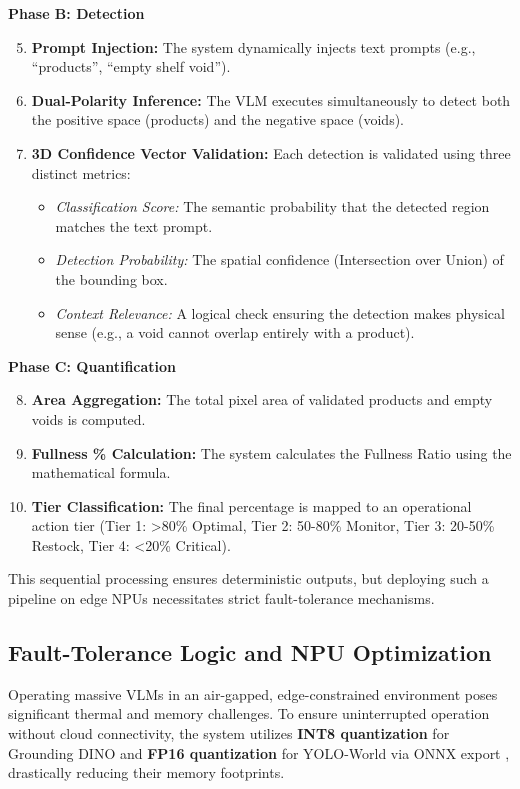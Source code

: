 \textbf{Phase B: Detection}
\begin{enumerate}
    \setcounter{enumi}{4}
    \item \textbf{Prompt Injection:} The system dynamically injects text prompts (e.g., ``products'', ``empty shelf void'').
    \item \textbf{Dual-Polarity Inference:} The VLM executes simultaneously to detect both the positive space (products) and the negative space (voids).
    \item \textbf{3D Confidence Vector Validation:} Each detection is validated using three distinct metrics:
    \begin{itemize}
        \item \textit{Classification Score:} The semantic probability that the detected region matches the text prompt.
        \item \textit{Detection Probability:} The spatial confidence (Intersection over Union) of the bounding box.
        \item \textit{Context Relevance:} A logical check ensuring the detection makes physical sense (e.g., a void cannot overlap entirely with a product).
    \end{itemize}
\end{enumerate}

\textbf{Phase C: Quantification}
\begin{enumerate}
    \setcounter{enumi}{7}
    \item \textbf{Area Aggregation:} The total pixel area of validated products and empty voids is computed.
    \item \textbf{Fullness \% Calculation:} The system calculates the Fullness Ratio using the mathematical formula.
    \item \textbf{Tier Classification:} The final percentage is mapped to an operational action tier (Tier 1: >80\% Optimal, Tier 2: 50-80\% Monitor, Tier 3: 20-50\% Restock, Tier 4: <20\% Critical).
\end{enumerate}

This sequential processing ensures deterministic outputs, but deploying such a pipeline on edge NPUs necessitates strict fault-tolerance mechanisms.

\subsection{Fault-Tolerance Logic and NPU Optimization}
Operating massive VLMs in an air-gapped, edge-constrained environment poses significant thermal and memory challenges. To ensure uninterrupted operation without cloud connectivity, the system utilizes \textbf{INT8 quantization} for Grounding DINO and \textbf{FP16 quantization} for YOLO-World via ONNX export \cite{ref:onnx}, drastically reducing their memory footprints. 

